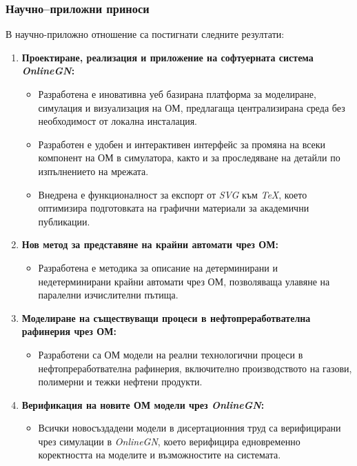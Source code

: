\subsubsection*{Научно--приложни приноси}

В научно-приложно отношение са постигнати следните резултати:

\begin{enumerate}[label=\arabic*., leftmargin=*]
	\item \textbf{Проектиране, реализация и приложение на софтуерната система \textit{OnlineGN}:}
	\begin{itemize}
		\item Разработена е иновативна уеб базирана платформа за моделиране, симулация и визуализация на ОМ, предлагаща централизирана среда без необходимост от локална инсталация.
		\item Разработен е удобен и интерактивен интерфейс за промяна на всеки компонент на ОМ в симулатора, както и за проследяване на детайли по изпълнението на мрежата.
		\item Внедрена е функционалност за експорт от \textit{SVG} към \textit{TeX}, което оптимизира подготовката на графични материали за академични публикации.
	\end{itemize}
	
	\item \textbf{Нов метод за представяне на крайни автомати чрез ОМ:}
	\begin{itemize}
		\item Разработена е методика за описание на детерминирани и недетерминирани крайни автомати чрез ОМ, позволяваща улавяне на паралелни изчислителни пътища.
	\end{itemize}
	
	\item \textbf{Моделиране на съществуващи процеси в нефтопреработвателна рафинерия чрез ОМ:}
	\begin{itemize}
		\item Разработени са ОМ модели на реални технологични процеси в нефтопреработвателна рафинерия, включително производството на газови, полимерни и тежки нефтени продукти.
	\end{itemize}
	
	\item \textbf{Верификация на новите ОМ модели чрез \textit{OnlineGN}:}
	\begin{itemize}
		\item Всички новосъздадени модели в дисертационния труд са верифицирани чрез симулации в \textit{OnlineGN}, което верифицира едновременно коректността на моделите и възможностите на системата.
	\end{itemize}
\end{enumerate}

